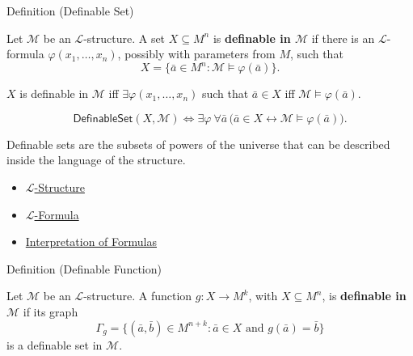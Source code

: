 
\begin{definitionbox}{Definition (Definable Set)}
\begin{definition}\label{def:definable-set}
Let $\mathcal{M}$ be an $\mathcal{L}$-structure. A set
$X\subseteq M^n$ is \textbf{definable in $\mathcal{M}$} if there is an
$\mathcal{L}$-formula $\varphi(x_1,\ldots,x_n)$, possibly with parameters
from $M$, such that
\[
  X=\{\bar a\in M^n : \mathcal{M}\models\varphi(\bar a)\}.
\]
\end{definition}
\end{definitionbox}

\begin{remark*}
$X$ is definable in $\mathcal{M}$ iff
$\exists\varphi(x_1,\ldots,x_n)$ such that
$\bar a\in X$ iff $\mathcal{M}\models\varphi(\bar a)$.
\end{remark*}

\begin{remark*}
\[
\mathsf{DefinableSet}(X,\mathcal{M})
\Longleftrightarrow
\exists\varphi\ \forall\bar a\,
\bigl(\bar a\in X \leftrightarrow \mathcal{M}\models\varphi(\bar a)\bigr).
\]
\end{remark*}

\begin{remark*}[Interpretation]
Definable sets are the subsets of powers of the universe that can be described
inside the language of the structure.
\end{remark*}

\begin{dependencies}
\begin{itemize}
  \item \hyperref[def:l-structure]{$\mathcal{L}$-Structure}
  \item \hyperref[def:l-formula]{$\mathcal{L}$-Formula}
  \item \hyperref[def:formula-interpretation]{Interpretation of Formulas}
\end{itemize}
\end{dependencies}

\begin{definitionbox}{Definition (Definable Function)}
\begin{definition}\label{def:definable-function}
Let $\mathcal{M}$ be an $\mathcal{L}$-structure. A function
$g\colon X\to M^k$, with $X\subseteq M^n$, is \textbf{definable in
$\mathcal{M}$} if its graph
\[
  \Gamma_g=\{(\bar a,\bar b)\in M^{n+k}: \bar a\in X \text{ and } g(\bar a)=\bar b\}
\]
is a definable set in $\mathcal{M}$.
\end{definition}
\end{definitionbox}

